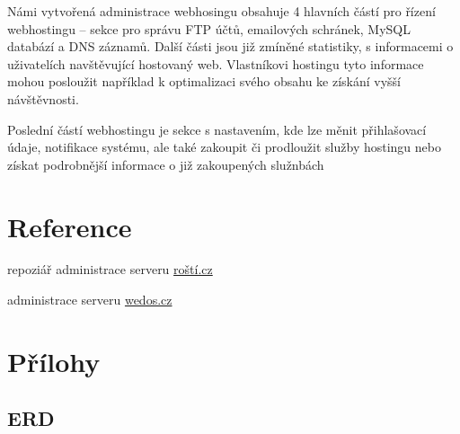 \documentclass[11pt,a4paper]{article}
\begin{document}
    Námi vytvořená administrace webhosingu obsahuje 4 hlavních částí pro řízení
    webhostingu -- sekce pro správu FTP účtů, emailových schránek, MySQL databází
    a DNS záznamů. Další části jsou již zmíněné statistiky, s informacemi o
    uživatelích navštěvující hostovaný web. Vlastníkovi hostingu tyto informace
    mohou posloužit například k optimalizaci svého obsahu ke získání vyšší návštěvnosti.

    Poslední částí webhostingu je sekce s nastavením, kde lze měnit přihlašovací
    údaje, notifikace systému, ale také zakoupit či prodloužit služby hostingu
    nebo získat podrobnější informace o již zakoupených služnbách



  \section{Reference}

    \begin{enumerate}[label={[\arabic*]}]
      \item repoziář administrace serveru \href{https://github.com/creckx/pcp}{roští.cz}
      \item administrace serveru \href{https://wedos.cz}{wedos.cz}
    \end{enumerate}

  \appendix
  \newpage

  \section{Přílohy}

    \subsection{ERD}
\end{document}

